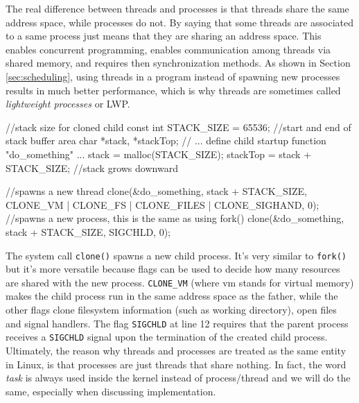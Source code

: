 The real difference between threads and processes is that threads share the same address space, while processes do not. By saying that some threads are associated to a same process just means that they are sharing an address space. This enables concurrent programming, enables communication among threads via shared memory, and requires then synchronization methods. As shown in Section \ref{sec:scheduling},
using threads in a program instead of spawning new processes results in much better performance, which is why threads are sometimes called \textit{lightweight processes} or LWP.
\begin{code}
//stack size for cloned child
const int STACK_SIZE = 65536;
//start and end of stack buffer area
char *stack, *stackTop;
// ... define child startup function "do_something" ...
stack = malloc(STACK_SIZE);
stackTop = stack + STACK_SIZE; //stack grows downward

//spawns a new thread
clone(&do_something, stack + STACK_SIZE, CLONE_VM | CLONE_FS | CLONE_FILES | CLONE_SIGHAND, 0); 
//spawns a new process, this is the same as using fork()
clone(&do_something, stack + STACK_SIZE, SIGCHLD, 0); 
\end{code}
The system call \verb|clone()| spawns a new child process. It's very
similar to \verb|fork()| but it's more versatile because flags can be
used to decide how many resources are shared with the new
process. \verb|CLONE_VM| (where vm stands for virtual memory) makes
the child process run in the same address space as the father, while
the other flags clone filesystem information (such as working
directory), open files and signal handlers. The flag \verb|SIGCHLD| at
line 12 requires that the parent process receives a \texttt{SIGCHLD}
signal upon the termination of the created child process.  Ultimately,
the reason why threads and processes are treated as the same entity in
Linux, is that processes are just threads that share nothing. In fact,
the word \textit{task} is always used inside the kernel instead of
process/thread and we will do the same, especially when discussing
implementation.

